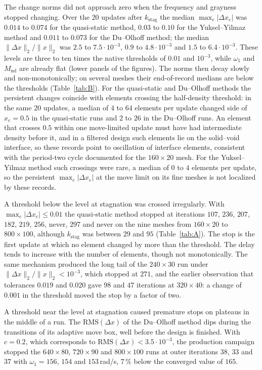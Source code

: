 \documentclass[11pt,a4paper]{article}
\newcommand{\Mnd}{M_{\mathrm{nd}}}
\newcommand{\kstag}{k_{\mathrm{stag}}}
\newcommand{\dx}{\Delta x}
\newcommand{\maxdx}{\max_e|\Delta x_e|}
\newcommand{\relL}{\|\Delta x\|_2/\|x\|_2}
\newcommand{\RMS}{\mathrm{RMS}}
\newcommand{\me}[2]{$#1\times#2$}
\begin{document}
The change norms did not approach zero when the frequency and grayness stopped changing. Over the 20 updates after $\kstag$ the median $\maxdx$ was $0.014$ to $0.074$ for the quasi-static method, $0.03$ to $0.10$ for the Yuksel--Yilmaz method and $0.011$ to $0.073$ for the Du--Olhoff method; the median $\relL$ was $2.5$ to $7.5\cdot10^{-3}$, $0.9$ to $4.8\cdot10^{-3}$ and $1.5$ to $6.4\cdot10^{-3}$. These levels are three to ten times the native thresholds of $0.01$ and $10^{-3}$, while $\omega_1$ and $\Mnd$ are already flat (lower panels of the figures). The norms then decay slowly and non-monotonically; on several meshes their end-of-record medians are below the thresholds (Table~\ref{tab:B}). For the quasi-static and Du--Olhoff methods the persistent changes coincide with elements crossing the half-density threshold: in the same 20 updates, a median of $4$ to $64$ elements per update changed side of $x_e = 0.5$ in the quasi-static runs and $2$ to $26$ in the Du--Olhoff runs. An element that crosses $0.5$ within one move-limited update must have had intermediate density before it, and in a filtered design such elements lie on the solid--void interface, so these records point to oscillation of interface elements, consistent with the period-two cycle documented for the \me{160}{20} mesh. For the Yuksel--Yilmaz method such crossings were rare, a median of $0$ to $4$ elements per update, so the persistent $\maxdx$ at the move limit on its fine meshes is not localized by these records.

A threshold below the level at stagnation was crossed irregularly. With $\maxdx \le 0.01$ the quasi-static method stopped at iterations $107$, $236$, $207$, $182$, $219$, $256$, never, $297$ and never on the nine meshes from \me{160}{20} to \me{800}{100}, although $\kstag$ was between $29$ and $95$ (Table~\ref{tab:A}). The stop is the first update at which no element changed by more than the threshold. The delay tends to increase with the number of elements, though not monotonically. The same mechanism produced the long tail of the \me{240}{30} run under $\relL < 10^{-3}$, which stopped at $271$, and the earlier observation that tolerances $0.019$ and $0.020$ gave $98$ and $47$ iterations at \me{320}{40}: a change of $0.001$ in the threshold moved the stop by a factor of two.

A threshold near the level at stagnation caused premature stops on plateaus in the middle of a run. The $\RMS(\dx)$ of the Du--Olhoff method dips during the transitions of its adaptive move box, well before the design is finished. With $c = 0.2$, which corresponds to $\RMS(\dx) < 3.5\cdot10^{-3}$, the production campaign stopped the \me{640}{80}, \me{720}{90} and \me{800}{100} runs at outer iterations $38$, $33$ and $37$ with $\omega_1 = 156$, $154$ and $153$\,rad/s, $7\,\%$ below the converged value of $165$.
\end{document}
